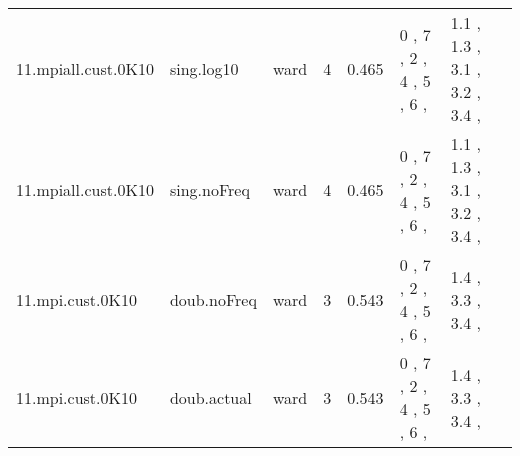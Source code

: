 \begin{table*}[]
{\begin{tabular}{|l|l|l|c|r|l|l|}
 11.mpiall.cust.0K10             & sing.log10   & ward          &        4 &     0.465 & 0 , 7 , 2 , 4 , 5 , 6 , & 1.1 , 1.3 , 3.1 , 3.2 , 3.4 ,       \\
 11.mpiall.cust.0K10             & sing.noFreq  & ward          &        4 &     0.465 & 0 , 7 , 2 , 4 , 5 , 6 , & 1.1 , 1.3 , 3.1 , 3.2 , 3.4 ,       \\
 11.mpi.cust.0K10                & doub.noFreq  & ward          &        3 &     0.543 & 0 , 7 , 2 , 4 , 5 , 6 , & 1.4 , 3.3 , 3.4 ,                   \\
 11.mpi.cust.0K10                & doub.actual  & ward          &        3 &     0.543 & 0 , 7 , 2 , 4 , 5 , 6 , & 1.4 , 3.3 , 3.4 ,                   \\
\hline
\end{tabular}}
\end{table*}


